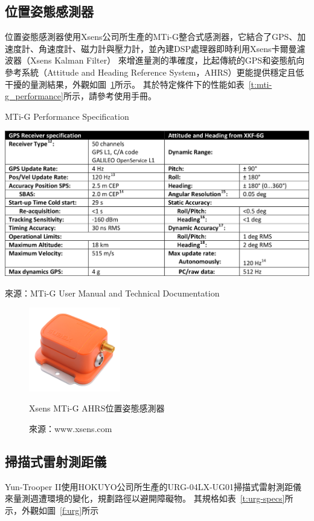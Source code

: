 \subsection{位置姿態感測器}
位置姿態感測器使用Xsens公司所生產的MTi-G整合式感測器，它結合了GPS、加速度計、角速度計、磁力計與壓力計，並內建DSP處理器即時利用Xsens卡爾曼濾波器（Xsens Kalman Filter）
來增進量測的準確度，比起傳統的GPS和姿態航向參考系統（Attitude and Heading Reference System，AHRS）更能提供穩定且低干擾的量測結果，外觀如圖~\ref{f:MTi-G}所示。
其於特定條件下的性能如表~\ref{t:mti-g_performance}所示，請參考使用手冊\cite{Xsens:2012:MTiG_Manual}。

\begin{table}[h!]
	\centering
	\caption{MTi-G Performance Specification}
	\label{t:mti-g_performance}
	\includegraphics[width=\textwidth]{tables/MTi-G_Performance}
	\caption*{來源：MTi-G User Manual and Technical Documentation\cite{Xsens:2012:MTiG_Manual}}
\end{table}

\begin{figure}[h!]
	\centering
	\includegraphics[width=4cm]{figures/MTi-G}
	\caption{Xsens MTi-G AHRS位置姿態感測器}
	\caption*{來源：www.xsens.com}
	\label{f:MTi-G}
\end{figure}

\subsection{掃描式雷射測距儀}
Yun-Trooper II使用HOKUYO公司所生產的URG-04LX-UG01掃描式雷射測距儀來量測週遭環境的變化，規劃路徑以避開障礙物。
其規格如表~\ref{t:urg-specs}所示，外觀如圖~\ref{f:urg}所示

